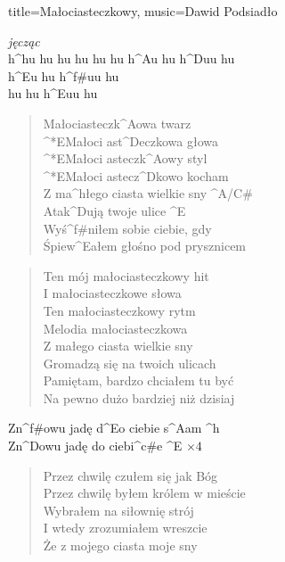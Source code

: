 \newpage
\small
\begin{song}{title={Małociasteczkowy}, music={Dawid Podsiadło}}
\begin{multicols}{2}
    \begin{intro}
    	\textit{jęcząc} \\
    	h^{h}u hu hu hu hu hu h^{A}u hu h^{D}uu hu \\
    	h^{E}u hu h^{f#}uu hu \\
    	hu hu h^{E}uu hu \\
    \end{intro}
    \begin{verse}
    	Małociasteczk^{A}owa twarz \\
		^*{E}Małoci ast^{D}eczkowa głowa \\
		^*{E}Małoci asteczk^{A}owy styl \\
		^*{E}Małoci astecz^{D}kowo kocham \\
		Z ma^{h}łego ciasta wielkie sny  ^{A/C#} \\
		Atak^{D}ują twoje ulice ^{E}  \\
		Wyś^{f#}niłem sobie ciebie, gdy \\
		Śpiew^{E}ałem głośno pod prysznicem
	\end{verse}
	\begin{verse}
		Ten mój małociasteczkowy hit \\
		I małociasteczkowe słowa \\
		Ten małociasteczkowy rytm \\
		Melodia małociasteczkowa \\
		Z małego ciasta wielkie sny \\
		Gromadzą się na twoich ulicach \\ 
		Pamiętam, bardzo chciałem tu być \\
		Na pewno dużo bardziej niż dzisiaj \\
	\end{verse}
	\begin{chorus}
		Zn^{f#}owu jadę d^{E}o ciebie s^{A}am ^{h} \\
		Zn^{D}owu jadę do ciebi^{c#}e ^{E} $\times 4$ 
	\end{chorus}
	\begin{verse}
		Przez chwilę czułem się jak Bóg \\
		Przez chwilę byłem królem w mieście \\
		Wybrałem na siłownię strój \\
		I wtedy zrozumiałem wreszcie \\
		Że z mojego ciasta moje sny \\

\end{verse}
\end{multicols}
\end{song}
